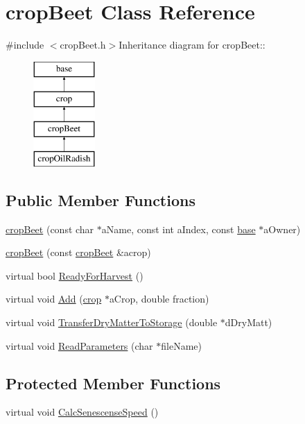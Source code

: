 \hypertarget{classcrop_beet}{
\section{cropBeet Class Reference}
\label{classcrop_beet}
}


{\ttfamily \#include $<$cropBeet.h$>$}Inheritance diagram for cropBeet::\begin{figure}[H]
\begin{center}
\leavevmode
\includegraphics[height=4cm]{classcrop_beet}
\end{center}
\end{figure}
\subsection*{Public Member Functions}
\begin{DoxyCompactItemize}
\item 
\hyperlink{classcrop_beet_a31078128d157b876e757ab86a94a86c2}{cropBeet} (const char $\ast$aName, const int aIndex, const \hyperlink{classbase}{base} $\ast$aOwner)
\item 
\hyperlink{classcrop_beet_a86e12275e8d30db6add7c11fe2a8e8a1}{cropBeet} (const \hyperlink{classcrop_beet}{cropBeet} \&acrop)
\item 
virtual bool \hyperlink{classcrop_beet_a0d8bc5bc5f448342e8dd52824443ab63}{ReadyForHarvest} ()
\item 
virtual void \hyperlink{classcrop_beet_a9fa3fb8bd859fd42e9ca6e888ccc349c}{Add} (\hyperlink{classcrop}{crop} $\ast$aCrop, double fraction)
\item 
virtual void \hyperlink{classcrop_beet_a6082dfaca5fc7cae98ec3fd5208d1380}{TransferDryMatterToStorage} (double $\ast$dDryMatt)
\item 
virtual void \hyperlink{classcrop_beet_af71b9c0b8eba3bf313c7d5b9ce485533}{ReadParameters} (char $\ast$fileName)
\end{DoxyCompactItemize}
\subsection*{Protected Member Functions}
\begin{DoxyCompactItemize}
\item 
virtual void \hyperlink{classcrop_beet_a17329d19a1bedcce1b23b661b3d1d82a}{CalcSenescenseSpeed} ()
\end{DoxyCompactItemize}
